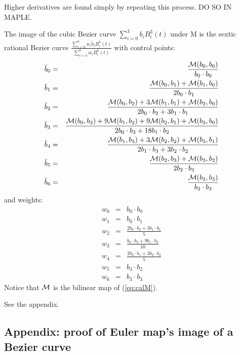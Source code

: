 \documentclass[12pt]{article}
\begin{document}
Higher derivatives are found simply by repeating this process. 
DO SO IN MAPLE.

\clearpage

\begin{theorem}
\label{thm:imagecurve}
The image of the cubic Bezier curve $\sum_{i=0}^3 b_i B_i^3(t)$ under M 
is the sextic rational Bezier curve $\frac{\sum_{i=0}^6 w_i \breve{b}_i B_i^6(t)}
                                          {\sum_{i=0}^6 w_i B_i^6(t)}$ 
with control points:
\begin{eqnarray}
\breve{b}_0 & = & \frac{{\cal M}(b_0,b_0)}{b_0 \cdot b_0} \nonumber \\
\breve{b}_1 & = & \frac{{\cal M}(b_0,b_1) + {\cal M}(b_1,b_0)}{2b_0\cdot b_1} \nonumber \\
\breve{b}_2 & = & \frac{{\cal M}(b_0,b_2) + 3{\cal M}(b_1,b_1) + {\cal M}(b_2,b_0)}{2b_0 \cdot b_2 + 3b_1 \cdot b_1} \nonumber \\
\breve{b}_3 & = & \frac{{\cal M}(b_0,b_3) + 9{\cal M}(b_1,b_2) + 9{\cal M}(b_2,b_1) + {\cal M}(b_3,b_0)}{2b_0 \cdot b_3 + 18 b_1 \cdot b_2} \nonumber \\
\breve{b}_4 & = & \frac{{\cal M}(b_1,b_3) + 3{\cal M}(b_2,b_2) + {\cal M}(b_3,b_1)}{2b_1 \cdot b_3 + 3 b_2 \cdot b_2} \nonumber \\
\breve{b}_5 & = & \frac{{\cal M}(b_2,b_3) + {\cal M}(b_3,b_2)}{2b_2 \cdot b_3} \nonumber \\
\breve{b}_6 & = & \frac{{\cal M}(b_3,b_3)}{b_3 \cdot b_3} \nonumber
\end{eqnarray}
and weights:
\begin{eqnarray}
w_0 & = & b_0 \cdot b_0 \nonumber \\
w_1 & = & b_0 \cdot b_1 \nonumber \\
w_2 & = & \frac{2b_0 \cdot b_2 + 3b_1 \cdot b_1}{5} \nonumber \\
w_3 & = & \frac{b_0 \cdot b_3 + 9b_1 \cdot b_2}{10} \nonumber \\
w_4 & = & \frac{2b_3 \cdot b_1 + 3b_2 \cdot b_2}{5} \nonumber \\
w_5 & = & b_3 \cdot b_2 \nonumber \\
w_6 & = & b_3 \cdot b_3 \nonumber
\end{eqnarray}
Notice that ${\cal M}$ is the bilinear map of (\ref{eq:calM}).
\end{theorem}
\prf See the appendix.
\QED

\clearpage

\subsection{Appendix: proof of Euler map's image of a Bezier curve}
\label{sec:appendix}
\end{document}
